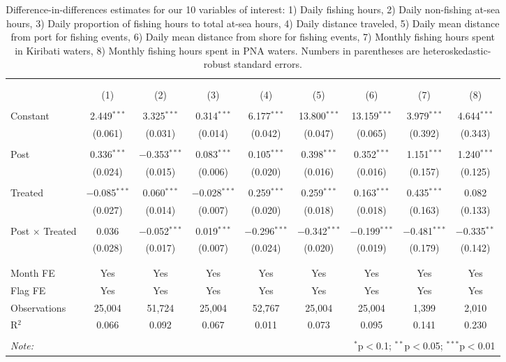
\begin{table}[!htbp] \centering 
  \caption{\label{tab:main_DID}Difference-in-differences estimates for our 10 variables of interest: 1) Daily fishing hours, 2) Daily non-fishing at-sea hours, 3) Daily proportion of fishing hours to total at-sea hours, 4) Daily distance traveled, 5) Daily mean distance from port for fishing events, 6) Daily mean distance from shore for fishing events, 7) Monthly fishing hours spent in Kiribati waters, 8) Monthly fishing hours spent in PNA waters. Numbers in parentheses are heteroskedastic-robust standard errors.} 
  \label{} 
\footnotesize 
\begin{tabular}{@{\extracolsep{1pt}}lcccccccc} 
\\[-1.8ex]\hline 
\hline \\[-1.8ex] 
\\[-1.8ex] & (1) & (2) & (3) & (4) & (5) & (6) & (7) & (8)\\ 
\hline \\[-1.8ex] 
 Constant & 2.449$^{***}$ & 3.325$^{***}$ & 0.314$^{***}$ & 6.177$^{***}$ & 13.800$^{***}$ & 13.159$^{***}$ & 3.979$^{***}$ & 4.644$^{***}$ \\ 
  & (0.061) & (0.031) & (0.014) & (0.042) & (0.047) & (0.065) & (0.392) & (0.343) \\ 
  & & & & & & & & \\ 
 Post & 0.336$^{***}$ & $-$0.353$^{***}$ & 0.083$^{***}$ & 0.105$^{***}$ & 0.398$^{***}$ & 0.352$^{***}$ & 1.151$^{***}$ & 1.240$^{***}$ \\ 
  & (0.024) & (0.015) & (0.006) & (0.020) & (0.016) & (0.016) & (0.157) & (0.125) \\ 
  & & & & & & & & \\ 
 Treated & $-$0.085$^{***}$ & 0.060$^{***}$ & $-$0.028$^{***}$ & 0.259$^{***}$ & 0.259$^{***}$ & 0.163$^{***}$ & 0.435$^{***}$ & 0.082 \\ 
  & (0.027) & (0.014) & (0.007) & (0.020) & (0.018) & (0.018) & (0.163) & (0.133) \\ 
  & & & & & & & & \\ 
 Post $\times$ Treated & 0.036 & $-$0.052$^{***}$ & 0.019$^{***}$ & $-$0.296$^{***}$ & $-$0.342$^{***}$ & $-$0.199$^{***}$ & $-$0.481$^{***}$ & $-$0.335$^{**}$ \\ 
  & (0.028) & (0.017) & (0.007) & (0.024) & (0.020) & (0.019) & (0.179) & (0.142) \\ 
  & & & & & & & & \\ 
\hline \\[-1.8ex] 
Month FE & Yes & Yes & Yes & Yes & Yes & Yes & Yes & Yes \\ 
Flag FE & Yes & Yes & Yes & Yes & Yes & Yes & Yes & Yes \\ 
Observations & 25,004 & 51,724 & 25,004 & 52,767 & 25,004 & 25,004 & 1,399 & 2,010 \\ 
R$^{2}$ & 0.066 & 0.092 & 0.067 & 0.011 & 0.073 & 0.095 & 0.141 & 0.230 \\ 
\hline 
\hline \\[-1.8ex] 
\textit{Note:}  & \multicolumn{8}{r}{$^{*}$p$<$0.1; $^{**}$p$<$0.05; $^{***}$p$<$0.01} \\ 
\end{tabular} 
\end{table} 
